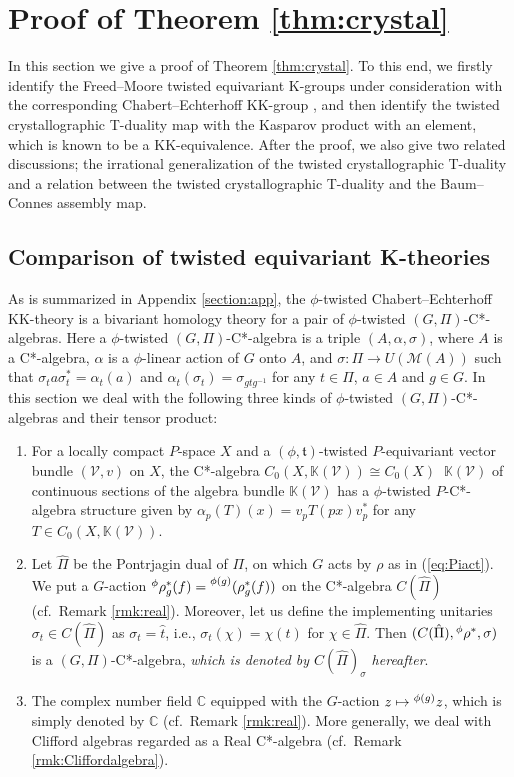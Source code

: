 \documentclass[11pt]{amsart}
\theoremstyle{definition}
\theoremstyle{plain}
\theoremstyle{remark}
\newcommand{\bC}{\mathbb{C}}
\newcommand{\bK}{\mathbb{K}}
\newcommand{\cM}{\mathcal{M}}
\newcommand{\ft}{\mathfrak{t}}
\newcommand{\sV}{\mathscr{V}}
\DeclareMathOperator{\hotimes}{\hat{\otimes}}
\begin{document}
\section{Proof of Theorem \ref{thm:crystal}}\label{section:5}
In this section we give a proof of Theorem \ref{thm:crystal}. To this end, we firstly identify the Freed--Moore twisted equivariant K-groups under consideration with the corresponding Chabert--Echterhoff KK-group \cite{chabertTwistedEquivariantKK2001}, and then identify the twisted crystallographic T-duality map with the Kasparov product with an element, which is known to be a KK-equivalence. 
After the proof, we also give two related discussions; the irrational generalization of the twisted crystallographic T-duality and a relation between the twisted crystallographic T-duality and the Baum--Connes assembly map.  

\subsection{Comparison of twisted equivariant K-theories}
As is summarized in Appendix \ref{section:app}, the $\phi$-twisted Chabert--Echterhoff KK-theory is a bivariant homology theory for a pair of $\phi$-twisted $(G,\Pi)$-C*-algebras. 
Here a $\phi$-twisted $(G,\Pi)$-C*-algebra is a triple $(A,\alpha, \sigma)$, where $A$ is a C*-algebra, $\alpha$ is a $\phi$-linear action of $G$ onto $A$, and $\sigma \colon \Pi \to U(\cM (A))$ such that $\sigma_t a \sigma_t^* = \alpha_t(a)$ and $\alpha_t(\sigma_t)=\sigma_{gtg^{-1}}$ for any $t \in \Pi$, $a \in A$ and $g\in G$. 
In this section we deal with the following three kinds of $\phi$-twisted $(G,\Pi)$-C*-algebras and their tensor product:
\begin{enumerate}
\item For a locally compact $P$-space $X$ and a $(\phi,\ft)$-twisted $P$-equivariant vector bundle $(\sV, v)$ on $X$, the C*-algebra $C_0(X, \bK(\sV)) \cong C_0(X) \hotimes \bK(\sV)$ of continuous sections of the algebra bundle $\bK(\sV)$ has a $\phi$-twisted $P$-C*-algebra structure given by $\alpha_p(T)(x)=v_pT(px)v_p^*$ for any $T \in C_0(X,\bK(\sV))$.
\item Let $\hat{\Pi}$ be the Pontrjagin dual of $\Pi$, on which $G$ acts by $\rho$ as in (\ref{eq:Piact}). We put a $G$-action $\prescript{\phi}{} \rho^*_g(f)= \prescript{\phi(g)}{}{(\rho^*_g(f))}$ on the C*-algebra $C(\hat{\Pi})$ (cf.\ Remark \ref{rmk:real}). Moreover, let us define the implementing unitaries $\sigma_t \in C(\hat{\Pi}) $ as $\sigma _t = \hat{t}$, i.e., $\sigma_t(\chi)=\chi(t)$ for $\chi \in \hat{\Pi}$. Then $(C(\hat{\Pi}), \prescript{\phi}{} \rho^* ,  \sigma )$ is a $(G,\Pi)$-C*-algebra, \emph{which is denoted by $C(\hat{\Pi})_\sigma$ hereafter}. 
\item The complex number field $\bC$ equipped with the $G$-action $z \mapsto \prescript{\phi(g)}{}z$, which is simply denoted by $\bC$ (cf.\ Remark \ref{rmk:real}). More generally, we deal with Clifford algebras regarded as a Real C*-algebra (cf.\ Remark \ref{rmk:Cliffordalgebra}).
\end{enumerate}
\end{document}
